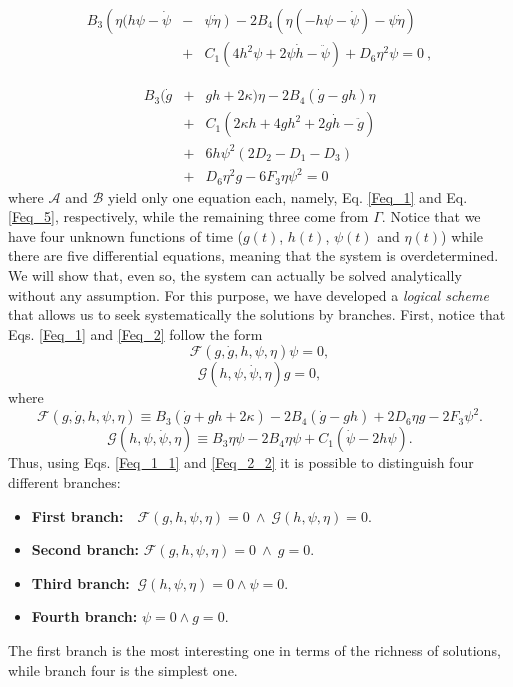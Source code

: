 \begin{eqnarray}
    \label{Feq_4}
    B_3\left(\eta(h\psi -\dot{\psi}\right. &-&\left. \psi\dot{\eta}\right) - 2B_4\left(\eta\left(-h\psi - \dot{\psi}\right) - \psi\dot{\eta}\right)   \\ &+& C_1\left(4h^2\psi + 2\psi\dot{h} -\ddot{\psi}\right) + D_6\eta^2\psi = 0 \ ,\nonumber 
\end{eqnarray}

\begin{eqnarray}
    \label{Feq_5}
    B_3(\dot{g} &+& gh + 2\kappa)\eta - 2B_4\left(\dot{g} - gh\right)\eta \nonumber \\ &+& C_1(2\kappa h + 4gh^2  + 2g\dot{h}- \ddot{g}) \nonumber \\ &+& 6h\psi^2\left(2D_2 - D_1 - D_3\right) \nonumber \\ &+& D_6 \eta^2 g - 6F_3\eta\psi^2 = 0
\end{eqnarray}
where $\mathcal{A}$ and $\mathcal{B}$ yield only one equation each, namely,  Eq. \eqref{Feq_1} and Eq. \eqref{Feq_5}, respectively, 
while the remaining three come from $\Gamma$. Notice that we have four unknown functions 
of time ($g(t)$, $h(t)$, $\psi(t)$ and $\eta(t)$) while there are five differential equations, meaning that the system is overdetermined. We will show that, even so, the system can actually be solved analytically without any assumption. For this purpose, we have developed a \textit{logical scheme} that allows us to seek systematically the solutions by branches. First, notice that Eqs. \eqref{Feq_1} 
and \eqref{Feq_2} follow the form
\begin{dmath}
    \label{Feq_1_1}
    \mathcal{F}(g, \dot{g}, h,\psi,\eta)\psi = 0,
\end{dmath}
\begin{dmath}
    \label{Feq_2_2}
    \mathcal{G}(h,\psi, \dot{\psi}, \eta)g = 0,
\end{dmath}
where
\begin{dmath}
\mathcal{F}(g,\dot{g},h,\psi,\eta)  \equiv B_3\left(\dot{g} + gh + 2\kappa\right) - 2B_4\left(\dot{g} - gh\right) + 2D_6\eta g - 2F_3\psi^2.
\end{dmath}
\begin{dmath}
\mathcal{G}(h,\psi, \dot{\psi}, \eta)  \equiv B_3\eta\psi -2B_4\eta\psi + C_1\left(\dot{\psi} - 2h\psi\right).
\end{dmath}
Thus, using Eqs. \eqref{Feq_1_1} and \eqref{Feq_2_2} it is possible to distinguish four different branches:
\begin{itemize}
    \item {\bf First branch:}  { $ \ \ \ \mathcal{F}(g,h,\psi,\eta) \! = 0 \ \wedge \ \mathcal{G}(h,\psi,\eta) \!= \! 0$}.
    \item {\bf Second branch:} $ \mathcal{F}(g,h,\psi,\eta)  = 0 \ \wedge \ g  = 0$.
    \item {\bf Third branch:}   $\ \mathcal{G}(h,\psi,\eta)   = 0   \wedge  \psi  = 0$.
    \item {\bf Fourth branch:} $\psi  = 0  \wedge  g  = 0$.
\end{itemize}
The first branch is the most interesting one in terms of the richness of solutions, while branch four is the simplest one. 

